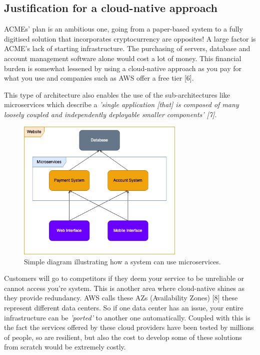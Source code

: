   \subsection{Justification for a cloud-native approach}
  ACMEs' plan is an ambitious one, going from a paper-based system to a fully digitised solution that incorporates cryptocurrency are opposites! A large 
  factor is ACME's lack of starting infrastructure. The purchasing of servers, database and account management software alone would
  cost a lot of money. This financial burden is somewhat lessened by using a cloud-native approach as you pay for what you use and companies such as AWS offer
  a free tier [6].
  
  This type of architecture also enables the use of the sub-architectures like microservices which describe a \textit{'single application [that] is 
  composed of many loosely coupled and independently deployable smaller components' [7]}.

  \begin{figure}[H]
    \centering
    \includegraphics[width=8cm]{assets/microservices.drawio.png}
    \caption{Simple diagram illustrating how a system can use microservices.}
    \label{fig:microservices}
  \end{figure}

  Customers will go to competitors if they deem your service to be unreliable or cannot access you're system. This is another area where cloud-native shines 
  as they provide redundancy. AWS calls these AZs (Availability Zones) [8] these represent different data centers. So if one data center 
  has an issue, your entire infrastructure can be \textit{'ported'} to another one automatically. Coupled with this is the fact the services offered by 
  these cloud providers have been tested by millions of people, so are resilient, but also the cost to develop some of these solutions from scratch would be
  extremely costly.

